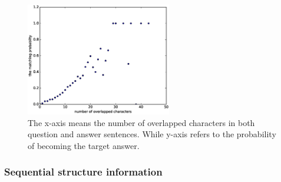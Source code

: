 \documentclass{llncs}
\begin{document}
\begin{table}[!htbp]
\begin{table}[!htbp]
\begin{figure}[htb]
	\begin{minipage}[t]{0.5\linewidth} 
	\subfigure
	\centering
		\includegraphics[width=2.5in]{figures/character_overlap.eps}
		\caption{The x-axis means the number of overlapped characters in both question and answer sentences. While y-axis refers to the probability of becoming the target answer.}
		\label{fig:character_overlap}
	\end{minipage}
\end{figure}


\subsubsection{Sequential structure information}


\end{table}
\end{table}
\end{document}
